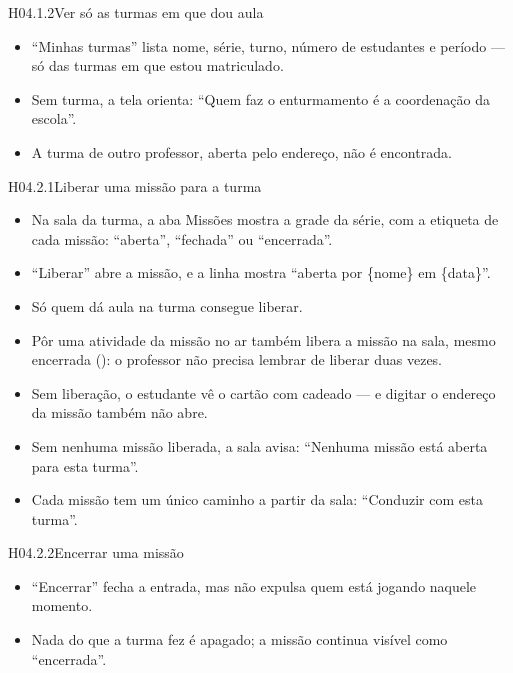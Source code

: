 \begin{historia}{H04.1.2}{Ver só as turmas em que dou aula}{\pronto}
\aceite
\begin{itemize}
  \item \enquote{Minhas turmas} lista nome, série, turno, número de estudantes
    e período --- só das turmas em que estou matriculado.
  \item Sem turma, a tela orienta: \enquote{Quem faz o enturmamento é a
    coordenação da escola}.
  \item A turma de outro professor, aberta pelo endereço, não é encontrada.
\end{itemize}
\end{historia}


\begin{historia}{H04.2.1}{Liberar uma missão para a turma}{\pronto}
\aceite
\begin{itemize}
  \item Na sala da turma, a aba Missões mostra a grade da série, com a
    etiqueta de cada missão: \enquote{aberta}, \enquote{fechada} ou
    \enquote{encerrada}.
  \item \enquote{Liberar} abre a missão, e a linha mostra \enquote{aberta por
    \{nome\} em \{data\}}.
  \item Só quem dá aula na turma consegue liberar.
  \item Pôr uma atividade da missão no ar também libera a missão na sala,
    mesmo encerrada (): o professor não precisa lembrar de
    liberar duas vezes.
  \item Sem liberação, o estudante vê o cartão com cadeado --- e digitar o
    endereço da missão também não abre.
  \item Sem nenhuma missão liberada, a sala avisa: \enquote{Nenhuma missão está
    aberta para esta turma}.
  \item Cada missão tem um único caminho a partir da sala: \enquote{Conduzir
    com esta turma}.
\end{itemize}
\end{historia}

\begin{historia}{H04.2.2}{Encerrar uma missão}{\pronto}
\aceite
\begin{itemize}
  \item \enquote{Encerrar} fecha a entrada, mas não expulsa quem está jogando
    naquele momento.
  \item Nada do que a turma fez é apagado; a missão continua visível como
    \enquote{encerrada}.
\end{itemize}
\end{historia}

